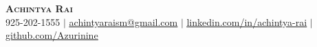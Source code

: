 \begin{center}
    \textbf{\Huge \scshape Achintya Rai} \\ \vspace{1pt}
    \small 925-202-1555 $|$ \href{mailto:achintyaraism@gmail.com}{\underline{achintyaraism@gmail.com}} $|$ 
    \href{https://www.linkedin.com/in/achintya-rai/}{\underline{linkedin.com/in/achintya-rai}} $|$
    \href{https://github.com/Azurinine}{\underline{github.com/Azurinine}}
\end{center}